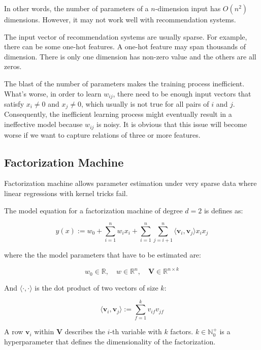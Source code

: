         In other words, the number of parameters of a $n$-dimension input has $O(n^2)$ dimensions.
        However, it may not work well with recommendation systems.

        The input vector of recommendation systems are usually sparse.
        For example, there can be some one-hot features.
        A one-hot feature may span thousands of dimension.
        There is only one dimension has non-zero value and the others are all zeros.

        The blast of the number of parameters makes the training process inefficient.
        What's worse, in order to learn $w_{ij}$,
        there need to be enough input vectors that satisfy $x_i \neq 0$ and $x_j \neq 0$,
        which usually is not true for all pairs of $i$ and $j$.
        Consequently, the inefficient learning process might eventually result in a ineffective model
        because $w_{ij}$ is noisy.
        It is obvious that this issue will become worse if we want to capture relations of three or more features.

    \subsection{Factorization Machine}

        Factorization machine allows parameter estimation under very sparse data
        where linear regressions with kernel tricks fail. \cite{Rendle2010}

        The model equation for a factorization machine of degree $d=2$ is defines as:

        \begin{equation}
        y(x) := w_0 + \sum_{i=1}^n w_i x_i + \sum_{i=1}^n\sum_{j=i+1}^n \langle \bm{v}_i, \bm{v}_j \rangle x_ix_j
        \label{eq:fm}
        \end{equation}

        where the the model parameters that have to be estimated are:

        \[
        w_0 \in \mathbb{R}, \quad w \in \mathbb{R}^n, \quad \bm{V} \in \mathbb{R}^{n \times k}
        \]

        And $\langle \cdot, \cdot \rangle$ is the dot product of two vectors of size $k$:

        \[
        \langle \bm{v}_i, \bm{v}_j \rangle := \sum_{f=1}^k v_{if}v_{jf}
        \]

        A row $\bm{v}_i$ within $\bm{V}$ describes the $i$-th variable with $k$ factors.
        $k \in \mathbb{N}_0^+$ is a hyperparameter that defines the dimensionality of the factorization.

